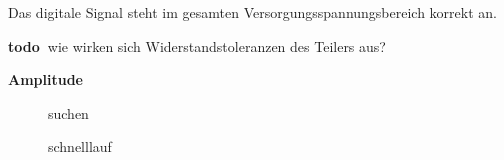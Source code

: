 \documentclass[ngerman,11pt,parskip=half] {scrartcl}
\newcommand {\todo} {\textbf{\color{red} todo\ }}
\newcommand {\tscopesize}{12cm}
\begin{document}
Das digitale Signal steht im gesamten Versorgungsspannungsbereich korrekt an. 

\todo wie wirken sich Widerstandstoleranzen des Teilers aus?

\textbf{Amplitude}

\begin{figure}[H]
\centering
{}
\caption{suchen} \label{fig:1}
\end{figure}

\begin{figure}[H]
\centering
{}
\caption{schnelllauf} \label{fig:1}
\end{figure}
\end{document}
